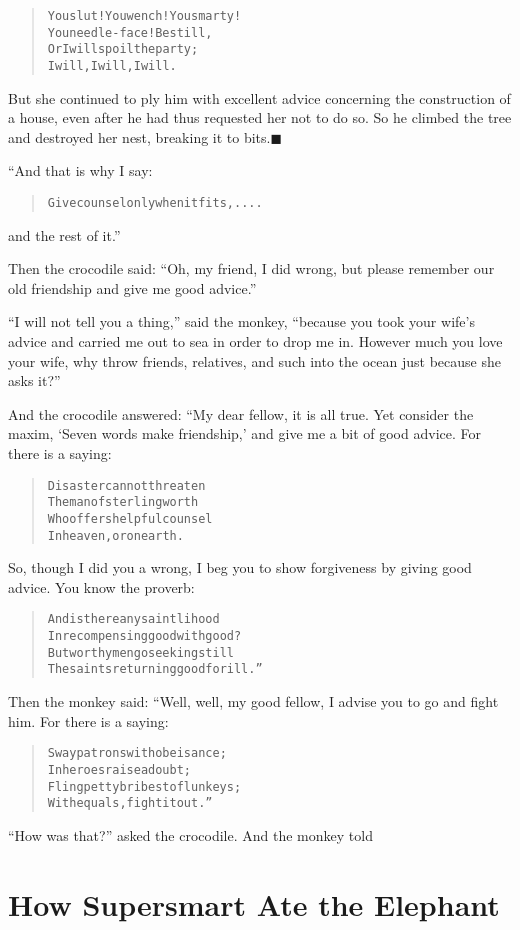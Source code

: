 \documentclass[article, twoside, 14pt]{memoir}
\newcommand{\qed}{\hfill \ensuremath{\blacksquare}}
\renewenvironment{verbatim}{%
\begin{quote}%
\vskip -10pt%
\begin{alltt}\normalfont\large}{\end{alltt}%
\end{quote}%
\vskip -10pt
} %
\begin{document}
\begin{verbatim}
You slut! You wench! You smarty!
    You needle-face! Be still,
Or I will spoil the party;
    I will, I will, I will.
\end{verbatim}
But she continued to ply him with excellent advice concerning the
construction of a house, even after he had thus requested her not
to do so. So he climbed the tree and destroyed her nest, breaking
it to bits.\hyperref[s75]{\qed}

“And that is why I say:

\begin{verbatim}
Give counsel only when it fits, ....
\end{verbatim}
and the rest of it.”

Then the crocodile said:
``Oh, my friend, I did wrong, but please remember our old friendship and give me good advice.''

``I will not tell you a thing,'' said the monkey,
``because you took your wife's advice and carried me out to sea in order to drop me in. However much you love your wife, why throw friends, relatives, and such into the ocean just because she asks it?''

And the crocodile answered: “My dear fellow, it is all true. Yet
consider the maxim, `Seven words make friendship,' and give me a
bit of good advice. For there is a saying:

\begin{verbatim}
Disaster cannot threaten
    The man of sterling worth
Who offers helpful counsel{\textemdash}
    In heaven, or on earth.
\end{verbatim}
So, though I did you a wrong, I beg you to show forgiveness by
giving good advice. You know the proverb:

\begin{verbatim}
And is there any saintlihood
In recompensing good with good?
But worthy men go seeking still
The saints returning good for ill.”
\end{verbatim}
Then the monkey said: “Well, well, my good fellow, I advise you to
go and fight him. For there is a saying:

\begin{verbatim}
Sway patrons with obeisance;
    In heroes raise a doubt;
Fling petty bribes to flunkeys;
    With equals, fight it out.”
\end{verbatim}
``How was that?'' asked the crocodile. And the monkey told

\chapter{How Supersmart Ate the Elephant}
\end{document}
